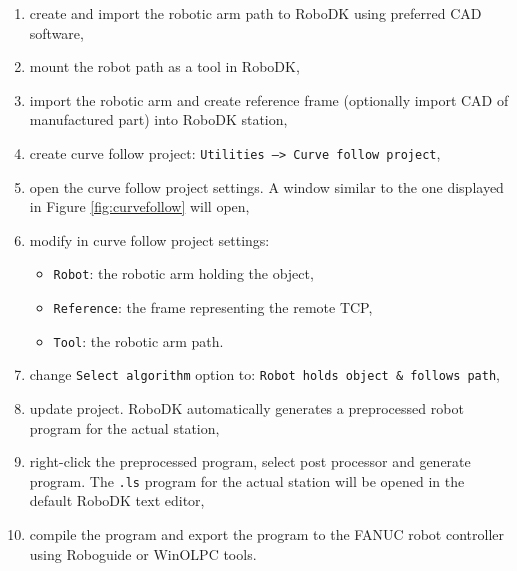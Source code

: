 \begin{enumerate}

\item create and import the robotic arm path to RoboDK using preferred CAD software,

\item mount the robot path as a tool in RoboDK,

\item import the robotic arm and create reference frame (optionally import CAD of manufactured part) into RoboDK station, 

\item create curve follow project: \texttt{Utilities --> Curve follow project},

\item open the curve follow project settings. A window similar to the one displayed in Figure \ref{fig:curvefollow} will open, 

\item modify in curve follow project settings:

    \begin{itemize}

        \item \texttt{Robot}: the robotic arm holding the object,
        \item \texttt{Reference}: the frame representing the remote TCP,
        \item \texttt{Tool}: the robotic arm path.
        
    \end{itemize}
    
\item change \texttt{Select algorithm} option to: \texttt{Robot holds object \& follows path},

\item update project. RoboDK automatically generates a preprocessed robot program for the actual station,

\item right-click the preprocessed program, select post processor and generate program. The \texttt{.ls} program for the actual station will be opened in the default RoboDK text editor,

\item compile the program and export the program to the FANUC robot controller using Roboguide or WinOLPC tools.
    
\end{enumerate}

